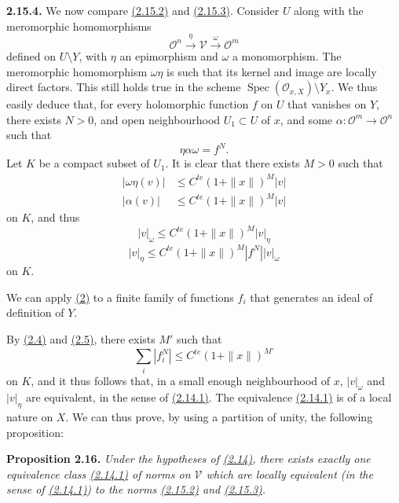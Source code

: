 \documentclass{report}
\newenvironment{itenv}[1]
  {\phantomsection\par\medskip\noindent\textbf{#1.}\itshape}
  {\par\medskip}
\newenvironment{rmenv}[1]
  {\phantomsection\par\medskip\noindent\textbf{#1.}\rmfamily}
  {\par\medskip}
\renewcommand{\cal}[1]{{\mathcal{#1}}}
\renewcommand{\leq}{\leqslant}
\DeclareMathOperator{\Spec}{Spec}
\newcommand{\oldpage}[1]{\marginpar{\footnotesize$\Big\vert$ \textit{p.~#1}}}
\begin{document}
\oldpage{67}
\begin{rmenv}{2.15.4}
\label{II.2.15.4}
  We now compare \hyperref[II.2.15.2]{(2.15.2)} and \hyperref[II.2.15.3]{(2.15.3)}.
  Consider $U$ along with the meromorphic homomorphisms
  \[
    \cal{O}^n \xrightarrow{\eta} \cal{V} \xrightarrow{\omega} \cal{O}^m
  \]
  defined on $U\setminus Y$, with $\eta$ an epimorphism and $\omega$ a monomorphism.
  The meromorphic homomorphism $\omega\eta$ is such that its kernel and image are locally direct factors.
  This still holds true in the scheme $\Spec(\cal{O}_{x,X})\setminus Y_x$.
  We thus easily deduce that, for every holomorphic function $f$ on $U$ that vanishes on $Y$, there exists $N>0$, and open neighbourhood $U_1\subset U$ of $x$, and some $\alpha\colon\cal{O}^m\to\cal{O}^n$ such that
  \[
    \eta\alpha\omega = f^N.
  \]
  Let $K$ be a compact subset of $U_1$.
  It is clear that there exists $M>0$ such that
  \[
    \begin{aligned}
      |\omega\eta(v)| &\leq C^{te}(1+\|x\|)^M |v|
    \\|\alpha(v)| &\leq C^{te}(1+\|x\|)^M |v|
    \end{aligned}
  \]
  on $K$, and thus
  \[
  \label{II.2.15.4.1}
    |v|_\omega \leq C^{te}(1+\|x\|)^M |v|_\eta
  \tag{1}
  \]
  \[
  \label{II.2.15.4.2}
    |v|_\eta \leq C^{te}(1+\|x\|)^M |f^N| |v|_\omega
  \tag{2}
  \]
  on $K$.

  We can apply \hyperref[II.2.15.4.2]{(2)} to a finite family of functions $f_i$ that generates an ideal of definition of $Y$.

  By \hyperref[II.2.4]{(2.4)} and \hyperref[II.2.5]{(2.5)}, there exists $M'$ such that
  \[
  \label{II.2.15.4.3}
    \sum_i |f_i^N| \leq C^{te}(1+\|x\|)^{M'}
  \tag{3}
  \]
  on $K$, and it thus follows that, in a small enough neighbourhood of $x$, $|v|_\omega$ and $|v|_\eta$ are equivalent, in the sense of \hyperref[II.2.14.1]{(2.14.1)}.
  The equivalence \hyperref[II.2.14.1]{(2.14.1)} is of a local nature on $X$.
  We can thus prove, by using a partition of unity, the following proposition:
\end{rmenv}

\begin{itenv}{Proposition 2.16}
\label{II.2.16}
  Under the hypotheses of \hyperref[II.2.14]{(2.14)}, there exists exactly one equivalence class \hyperref[II.2.14.1]{(2.14.1)} of norms on $\cal{V}$ which are locally equivalent (in the sense of \hyperref[II.2.14.1]{(2.14.1)}) to the norms \hyperref[II.2.15.2]{(2.15.2)} and \hyperref[II.2.15.3]{(2.15.3)}.
\end{itenv}
\end{document}
